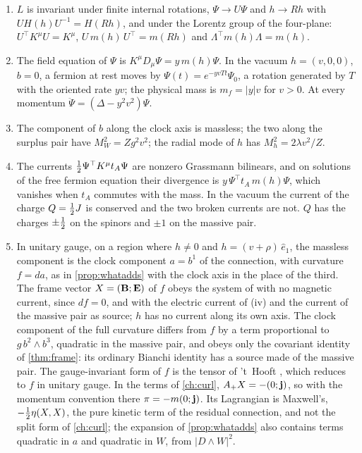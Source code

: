 \begin{proposition}
\label{prop:coupled}
\begin{enumerate}[label=(\roman*),leftmargin=2.2em,itemsep=1pt]
\item $L$ is invariant under finite internal rotations, $\Psi\to U\Psi$ and $h\to Rh$ with $UH(h)U^{-1}=H(Rh)$, and under the Lorentz group of
the four-plane: $U^\top K^\mu U=K^\mu$, $U\,m(h)\,U^\top=m(Rh)$ and $\Lambda^\top m(h)\Lambda=m(h)$.
\item The field equation of $\Psi$ is $K^\mu D_\mu\Psi=y\,m(h)\Psi$. In the vacuum $h=(v,0,0)$, $b=0$, a fermion at rest moves by
$\Psi(t)=e^{-yvTt}\Psi_0$, a rotation generated by $T$ with the oriented rate $yv$; the physical mass is $m_f=|y|v$ for $v>0$. At every momentum
$\ddot\Psi=(\Delta-y^2v^2)\Psi$.
\item The component of $b$ along the clock axis is massless; the two along the surplus pair have $M_W^2=Zg^2v^2$; the radial mode of $h$ has
$M_h^2=2\lambda v^2/Z$.
\item The currents $\tfrac12\Psi^\top K^\mu t_A\Psi$ are nonzero Grassmann bilinears, and on solutions of the free fermion equation their
divergence is $y\,\Psi^\top t_A\,m(h)\Psi$, which vanishes when $t_A$ commutes with the mass. In the vacuum the current of the charge
$Q=\tfrac12 J$ is conserved and the two broken currents are not. $Q$ has the charges $\pm\tfrac12$ on the spinors and $\pm1$ on the massive pair.
\item In unitary gauge, on a region where $h\ne0$ and $h=(v+\rho)\,\hat e_1$, the massless component is the clock component $a=b^1$ of the
connection, with curvature $f=da$, as in \cref{prop:whatadds} with the clock axis in the place of the third. The frame vector $X=(\mathbf B;\mathbf E)$
of $f$ obeys the system of  with no magnetic current, since $df=0$, and with the electric current of (iv) and the current of
the massive pair as source; $h$ has no current along its own axis. The clock component of the full curvature differs from $f$ by a term
proportional to $g\,b^2\wedge b^3$, quadratic in the massive pair, and obeys only the covariant identity of \cref{thm:frame}: its ordinary
Bianchi identity has a source made of the massive pair. The gauge-invariant form of $f$ is the tensor of 't~Hooft \cite{tHooft74}, which
reduces to $f$ in unitary gauge. In the terms of \cref{ch:curl}, $A_+X=-(0;\mathbf j)$, so with the momentum convention there $\pi=-m(0;\mathbf j)$. Its
Lagrangian is Maxwell's, $-\tfrac12\eta(X,X)$, the pure kinetic term of the residual connection, and not the split form of \cref{ch:curl}; the
expansion of \cref{prop:whatadds} also contains terms quadratic in $a$ and quadratic in $W$, from $|D\wedge W|^2$.
\end{enumerate}
\end{proposition}

